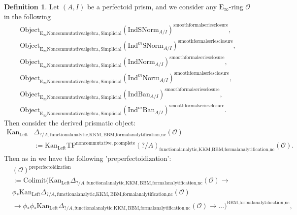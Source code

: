 \documentclass[11pt]{book}
\theoremstyle{definition}
\newtheorem{definition}[theorem]{Definition}
\numberwithin{equation}{section}
\begin{document}
\begin{definition}
Let $(A,I)$ be a perfectoid prism, and we consider any $\mathrm{E}_\infty$-ring $\mathcal{O}$ in the following
\begin{align}
\mathrm{Object}_{\mathrm{E}_\infty\mathrm{Noncommutativealgebra},\mathrm{Simplicial}}(\mathrm{IndSNorm}_{A/I})^{\mathrm{smoothformalseriesclosure}},\\
\mathrm{Object}_{\mathrm{E}_\infty\mathrm{Noncommutativealgebra},\mathrm{Simplicial}}(\mathrm{Ind}^m\mathrm{SNorm}_{A/I})^{\mathrm{smoothformalseriesclosure}},\\
\mathrm{Object}_{\mathrm{E}_\infty\mathrm{Noncommutativealgebra},\mathrm{Simplicial}}(\mathrm{IndNorm}_{A/I})^{\mathrm{smoothformalseriesclosure}},\\
\mathrm{Object}_{\mathrm{E}_\infty\mathrm{Noncommutativealgebra},\mathrm{Simplicial}}(\mathrm{Ind}^m\mathrm{Norm}_{A/I})^{\mathrm{smoothformalseriesclosure}},\\
\mathrm{Object}_{\mathrm{E}_\infty\mathrm{Noncommutativealgebra},\mathrm{Simplicial}}(\mathrm{IndBan}_{A/I})^{\mathrm{smoothformalseriesclosure}},\\
\mathrm{Object}_{\mathrm{E}_\infty\mathrm{Noncommutativealgebra},\mathrm{Simplicial}}(\mathrm{Ind}^m\mathrm{Ban}_{A/I})^{\mathrm{smoothformalseriesclosure}}.
\end{align}
Then consider the derived prismatic object:
\begin{align}
\mathrm{Kan}_{\mathrm{Left}}&\Delta_{?/A,\text{functionalanalytic,KKM},\text{BBM,formalanalytification,nc}}(\mathcal{O})\\
&:=\mathrm{Kan}_{\mathrm{Left}}\mathrm{TP}^\mathrm{noncommutative,pcomplete}(?/A)_{\text{functionalanalytic,KKM},\text{BBM,formalanalytification,nc}}(\mathcal{O}).
\end{align}	
Then as in \cite[Definition 8.2]{12BS} we have the following 'preperfectoidization':
\begin{align}
&(\mathcal{O})^{\text{preperfectoidization}}\\
&:=\mathrm{Colimit}(\mathrm{Kan}_{\mathrm{Left}}\Delta_{?/A,\text{functionalanalytic,KKM},\text{BBM,formalanalytification,nc}}(\mathcal{O})\rightarrow \\
&\phi_*\mathrm{Kan}_{\mathrm{Left}}\Delta_{?/A,\text{functionalanalytic,KKM},\text{BBM,formalanalytification,nc}}(\mathcal{O})\\
&\rightarrow \phi_* \phi_*\mathrm{Kan}_{\mathrm{Left}}\Delta_{?/A,\text{functionalanalytic,KKM},\text{BBM,formalanalytification,nc}}(\mathcal{O})\rightarrow...)^{\text{BBM,formalanalytification,nc}},	

\end{align}
\end{definition}
\end{document}
